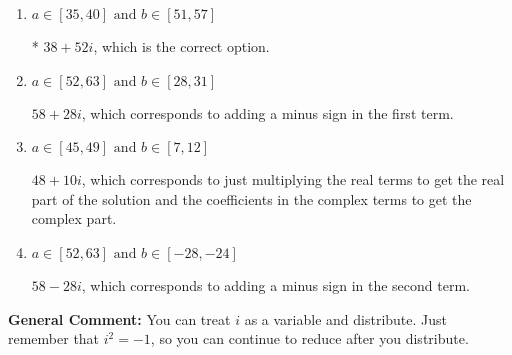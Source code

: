 \documentclass{extbook}[14pt]
\begin{document}
\begin{enumerate}
{\begin{enumerate}[label=\Alph*.]
 $38 - 52 i$, which corresponds to adding a minus sign in both terms.
\item \( a \in [35, 40] \text{ and } b \in [51, 57] \)

* $38 + 52 i$, which is the correct option.
\item \( a \in [52, 63] \text{ and } b \in [28, 31] \)

 $58 + 28 i$, which corresponds to adding a minus sign in the first term.
\item \( a \in [45, 49] \text{ and } b \in [7, 12] \)

 $48 + 10 i$, which corresponds to just multiplying the real terms to get the real part of the solution and the coefficients in the complex terms to get the complex part.
\item \( a \in [52, 63] \text{ and } b \in [-28, -24] \)

 $58 - 28 i$, which corresponds to adding a minus sign in the second term.
\end{enumerate}

\textbf{General Comment:} You can treat $i$ as a variable and distribute. Just remember that $i^2=-1$, so you can continue to reduce after you distribute.
}
\end{enumerate}
\end{document}
